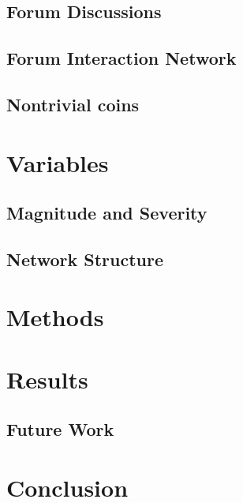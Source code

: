 \documentclass{acm_proc_article_sp}%
\begin{document}
\subsection{Forum Discussions}


\subsection{Forum Interaction Network}


\subsection{Nontrivial coins}


\section{Variables}
\subsection{Magnitude and Severity} \label{variables_nikete}


\subsection{Network Structure}


\section{Methods }


\section{Results}




\subsection{Future Work}


\section{Conclusion}


%
%
\end{document}
